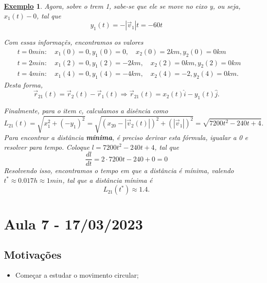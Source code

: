 \documentclass{article}
\newtheorem{example}{\underline{Exemplo}}
\begin{document}
\begin{example}
      Agora, sobre o trem 1, sabe-se que ele se move no eixo y, ou seja, $x_{1}(t) - 0$, tal que 
        $$
          y_{1}(t) = -|\vec{v}_{1}|t = -60t
        $$
      
    Com essas informa\c c\~es, encontramos os valores 
   \begin{align*}
     &t = 0min:\quad x_{1}(0) = 0, y_{1}(0) = 0,\quad x_{2}(0) = 2km, y_{2}(0) = 0km\\
     &t = 2min:\quad x_{1}(2) = 0, y_{1}(2) = -2km,\quad x_{2}(2) = 0km, y_{2}(2) = 0km\\
     &t = 4min:\quad x_{1}(4) = 0, y_{1}(4) = -4km,\quad x_{2}(4) = -2, y_{2}(4) = 0km.
   \end{align*}
   Desta forma, 
     $$
     \vec{r}_{21}(t) = \vec{r}_{2}(t) - \vec{r}_{1}(t) \Rightarrow \vec{r}_{21}(t) = x_{2}(t)\hat{i} - y_{1}(t)\hat{j}.
     $$

    Finalmente, para o item c, calculamos a dis\^encia como 
      $$
      L_{21}(t) = \sqrt{x_{1}^{2} + (-y_{1})^{2}} = \sqrt{(x_{20}-|\vec{v}_{2}(t)|)^{2} + (|\vec{v}_{1}|)^{2}} = \sqrt{7200t^{2} - 240t + 4}.
      $$
    Para encontrar a dist\^ancia \textbf{m\'inima}, \'e preciso derivar esta f\'ormula, igualar a 0 e resolver para tempo. Coloque $l = 7200t^{2}-240t+4$,
  tal que 
    $$
      \frac{dl}{dt} = 2 \cdot 7200t - 240 + 0 = 0
    $$
    Resolvendo isso, encontramos o tempo em que a dist\^ancia \'e m\'inima, valendo $t^{*}\approx 0.017h\approx 1min$, tal que a dist\^ancia m\'inima \'e 
      $$
        L_{21}(t^{*})\approx 1.4.
      $$
 \end{example}
\newpage

\section{Aula 7 - 17/03/2023}
\subsection{Motiva\c c\~oes}
\begin{itemize}
  \item Come\c car a estudar o movimento circular;
\end{itemize}
\end{document}
